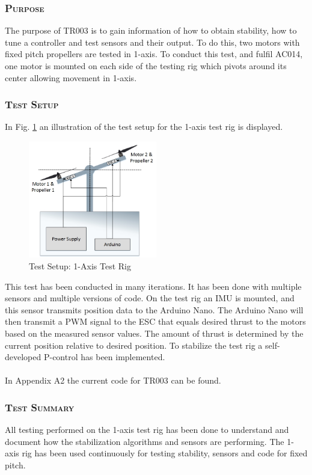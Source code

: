 \subsubsection*{\textsc{\medium Purpose}}
The purpose of TR003 is to gain information of how to obtain stability, how to tune a controller and test sensors and their output. To do this, two motors with fixed pitch propellers are tested in 1-axis. To conduct this test, and fulfil AC014, one motor is mounted on each side of the testing rig which pivots around its center allowing movement in 1-axis. 

\subsubsection*{\textsc{\medium Test Setup}}
In Fig. \ref{fig:testsetup3} an illustration of the test setup for the 1-axis test rig is displayed. 
\begin{figure}[H]
    \centering
    \includegraphics[width = 0.5\textwidth]{VAPIQ-PICTURES/TestSetup3}
    \caption{Test Setup: 1-Axis Test Rig}
    \label{fig:testsetup3}
\end{figure}

\noindent This test has been conducted in many iterations. It has been done with multiple sensors and multiple versions of code. On the test rig an IMU is mounted, and this sensor transmits position data to the Arduino Nano. The Arduino Nano will then transmit a PWM signal to the ESC that equals desired thrust to the motors based on the measured sensor values. The amount of thrust is determined by the current position relative to desired position. To stabilize the test rig a self-developed P-control has been implemented. \\
\\
In Appendix A2 the current code for TR003 can be found.

\subsubsection*{\textsc{\medium Test Summary}}
All testing performed on the 1-axis test rig has been done to understand and document how the stabilization algorithms and sensors are performing. The 1-axis rig has been used continuously for testing stability, sensors and code for fixed pitch. 

